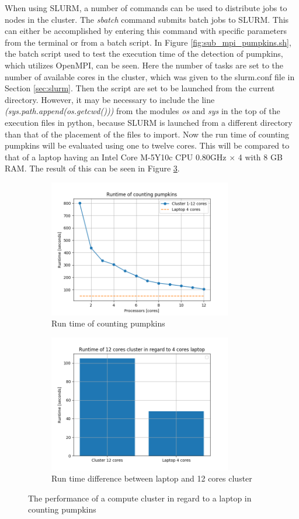 \documentclass[../Head/Report.tex]{subfiles}
\begin{document}
When using SLURM, a number of commands can be used to distribute jobs to nodes in the cluster. The \textit{sbatch} command submits batch jobs to SLURM. This can either be accomplished by entering this command with specific parameters from the terminal or from a batch script. In Figure \ref{fig:sub_mpi_pumpkins.sh}, the batch script used to test the execution time of the detection of pumpkins, which utilizes OpenMPI, can be seen. Here the number of tasks are set to the number of available cores in the cluster, which was given to the slurm.conf file in Section \ref{sec:slurm}. Then the script are set to be launched from the current directory. However, it may be necessary to include the line \textit{(sys.path.append(os.getcwd()))} from the modules \textit{os} and \textit{sys} in the top of the execution files in python, because SLURM is launched from a different directory than that of the placement of the files to import. Now the run time of counting pumpkins will be evaluated using one to twelve cores. This will be compared to that of a laptop having an Intel Core M-5Y10c CPU 0.80GHz $\times $ 4 with 8 GB RAM. The result of this can be seen in Figure \ref{fig:counting_pumpkins}. 

\begin{figure}[H]
\centering
  \begin{subfigure}[b]{0.48\textwidth}
  \centering
    \includegraphics[height=6cm]{../Figures/runtime_counting_pumpkins1.png}
    \caption{Run time of counting pumpkins}
    \label{fig:counting_pumpkins_plot}
  \end{subfigure}
  \hfill
  \begin{subfigure}[b]{0.48\textwidth}
  \centering
    \includegraphics[height=6cm]{../Figures/barchart_pumpkin_runtime.png}
    \caption{Run time difference between laptop and 12 cores cluster }
    \label{fig:counting_pumpkins_barchart}
  \end{subfigure}
  \caption{The performance of a compute cluster in regard to a laptop in counting pumpkins}
  \label{fig:counting_pumpkins}
\end{figure}  
\end{document}
